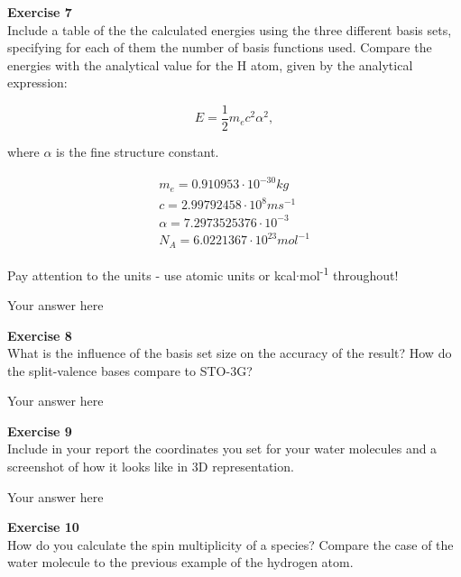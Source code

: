 \documentclass{article}
\begin{document}
\begin{mdframed}
\textbf{Exercise 7}\\
Include a table of the the calculated energies using the three different basis sets, specifying for each of them the number of basis functions used. Compare the energies with the analytical value for the H atom, given by the analytical expression:

\begin{equation}
E = \frac{1}{2} m_e c^2\alpha^2,
\end{equation}

where $\alpha$ is the fine structure constant.

\begin{equation}
\begin{align}
m_e = 0.910953\cdot10^{-30} kg\\
c = 2.99792458\cdot10^8 m s^{-1}\\
\alpha = 7.2973525376\cdot10^{-3}\\
N_A = 6.0221367\cdot10^{23}mol^{-1}
\end{align}
\end{equation}

Pay attention to the units - use atomic units or kcal$\cdot$mol\textsuperscript{-1} throughout!
\end{mdframed}

Your answer here

\begin{mdframed}
\textbf{Exercise 8}\\
What is the influence of the basis set size on the accuracy of the result? How do the split-valence bases compare to STO-3G?
\end{mdframed}

Your answer here

\begin{mdframed}
\textbf{Exercise 9}\\
Include in your report the coordinates you set for your water molecules and a screenshot of how it looks like in 3D representation.
\end{mdframed}

Your answer here

\begin{mdframed}
\textbf{Exercise 10}\\
How do you calculate the spin multiplicity of a species? Compare the case of the water molecule to the previous example of the hydrogen atom.
\end{mdframed}
\end{document}
